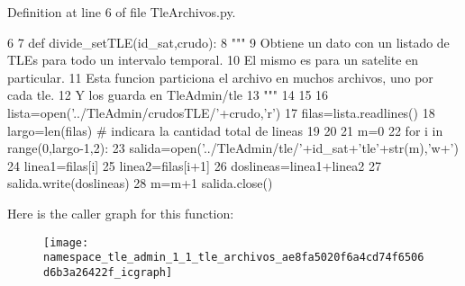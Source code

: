 \-Definition at line 6 of file \-Tle\-Archivos.\-py.


\begin{DoxyCode}
6 
7 def divide_setTLE(id_sat,crudo):
8     """
9     Obtiene un dato con un listado de TLEs para todo un intervalo temporal.
10     El mismo es para un satelite en particular.
11     Esta funcion particiona el archivo en muchos archivos, uno por cada tle.
12     Y los guarda en TleAdmin/tle
13     """
14     
15     
16     lista=open('../TleAdmin/crudosTLE/'+crudo,'r')
17     filas=lista.readlines()
18     largo=len(filas) # indicara la cantidad total de lineas
19         
20     
21     m=0
22     for i in range(0,largo-1,2):
23         salida=open('../TleAdmin/tle/'+id_sat+'tle'+str(m),'w+')
24         linea1=filas[i]
25         linea2=filas[i+1]
26         doslineas=linea1+linea2
27         salida.write(doslineas)
28         m=m+1
        salida.close()\end{DoxyCode}


\-Here is the caller graph for this function\-:\nopagebreak
\begin{figure}[H]
\begin{center}
\leavevmode
\texttt{[image: namespace\_tle\_admin\_1\_1\_tle\_archivos\_ae8fa5020f6a4cd74f6506d6b3a26422f\_icgraph]}
\end{center}
\end{figure}


